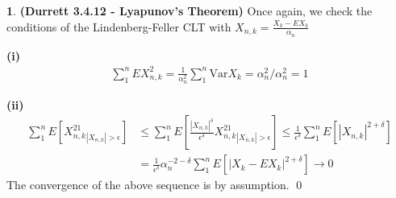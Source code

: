 \documentclass{article}
\theoremstyle{definition}
\newtheorem{pb}{}
\newcommand{\abs}[1]{\left\vert#1\right\vert}
\newcommand{\var}{\text{Var}}
\begin{document}
    \begin{pb}\textbf{(Durrett 3.4.12 - Lyapunov's Theorem)}
        Once again, we check the conditions of the Lindenberg-Feller CLT with \(X_{n,k} = \frac{X_k - EX_k}{\alpha_n}\)

        \textbf{(i)}
        \begin{align*}
            \sum_1^n EX_{n,k}^2 = \frac{1}{\alpha_n^2}\sum_1^n\var X_k = \alpha_n^2/\alpha_n^2 = 1
        \end{align*}

        \textbf{(ii)}
        \begin{align*}
            \sum_1^n E[X_{n,k}^21_{\abs{X_{n,k}} > \epsilon}] &\leq \sum_1^n E\left[\frac{\abs{X_{n,k}}^\delta}{\epsilon^\delta}X_{n,k}^21_{\abs{X_{n,k}} > \epsilon}\right] \leq \frac{1}{\epsilon^\delta}\sum_1^n E\left[\abs{X_{n,k}}^{2+\delta}\right] \\ &= \frac{1}{\epsilon^\delta} \alpha_n^{-2-\delta}\sum_1^n E[\abs{X_k - EX_k}^{2+\delta}] \to 0
        \end{align*}
        The convergence of the above sequence is by assumption. \qed
    \end{pb}
\end{document}
